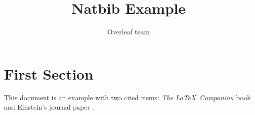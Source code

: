 \documentclass{article}
\title{Natbib Example}
\author{Overleaf team}
\begin{document}
	
	\maketitle
	
	\section{First Section}
	This document is an example with two cited items: \textit{The \LaTeX\ Companion} book \cite[see][chap 2]{latexcompanion} and Einstein's journal paper \citep{einstein}. 
	
	
	
	
\end{document}
